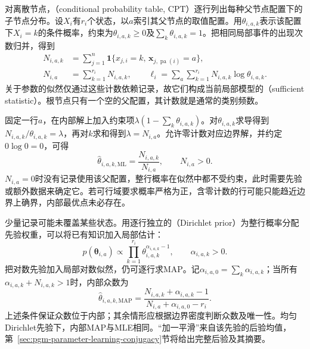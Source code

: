 对离散节点，（conditional probability table, CPT）逐行列出每种父节点配置下的子节点分布。设$X_i$有$r_i$个状态，以$a$索引其父节点的取值配置。用$\theta_{i,a,k}$表示该配置下$X_i=k$的条件概率，约束为$\theta_{i,a,k}\geq0$及$\sum_k\theta_{i,a,k}=1$。把相同局部事件的出现次数归并，得到
\begin{equation}
  \begin{aligned}
    N_{i,a,k}
      &=\sum_{j=1}^n
        \mathbf{1}\{x_{j,i}=k,\,
          \bm{x}_{j,\operatorname{pa}(i)}=a\},\\
    N_{i,a}&=\sum_{k=1}^{r_i}N_{i,a,k},\qquad
    \ell_i=\sum_a\sum_{k=1}^{r_i}
      N_{i,a,k}\log\theta_{i,a,k}.
  \end{aligned}
  \label{eq:pgm-parameter-learning-counts}
\end{equation}
关于参数的似然仅通过这些计数依赖记录，故它们构成当前局部模型的（sufficient statistic）。根节点只有一个空的父配置，其计数就是通常的类别频数。

固定一行$a$，在内部解上加入约束项$\lambda(1-\sum_k\theta_{i,a,k})$。对$\theta_{i,a,k}$求导得到$N_{i,a,k}/\theta_{i,a,k}=\lambda$，再对$k$求和得到$\lambda=N_{i,a}$。允许零计数对应边界解，并约定$0\log0=0$，可得
\begin{equation}
  \widehat{\theta}_{i,a,k,\mathrm{ML}}
    =\frac{N_{i,a,k}}{N_{i,a}},\qquad N_{i,a}>0.
  \label{eq:pgm-parameter-learning-cpt-mle}
\end{equation}
$N_{i,a}=0$时没有记录使用该父配置，整行概率在似然中都不受约束，此时需要先验或额外数据来确定它。若可行域要求概率严格为正，含零计数的行可能只能趋近边界上确界，内部最优点未必存在。

少量记录可能未覆盖某些状态。用逐行独立的（Dirichlet prior）为整行概率分配先验权重，可以将已有知识加入局部估计：
\[
  p(\bm{\theta}_{i,a})
  \propto\prod_{k=1}^{r_i}
    \theta_{i,a,k}^{\alpha_{i,a,k}-1},
  \qquad \alpha_{i,a,k}>0.
\]
把对数先验加入局部对数似然，仍可逐行求MAP。记$\alpha_{i,a,0}=\sum_k\alpha_{i,a,k}$；当所有$\alpha_{i,a,k}+N_{i,a,k}>1$时，内部众数为
\begin{equation}
  \widehat{\theta}_{i,a,k,\mathrm{MAP}}
    =\frac{N_{i,a,k}+\alpha_{i,a,k}-1}
            {N_{i,a}+\alpha_{i,a,0}-r_i}.
  \label{eq:pgm-parameter-learning-cpt-map}
\end{equation}
上述条件保证众数位于内部；其余情形应根据边界密度判断众数及唯一性。均匀Dirichlet先验下，内部MAP与MLE相同。“加一平滑”来自该先验的后验均值，第~\ref{sec:pgm-parameter-learning-conjugacy}节将给出完整后验及其摘要。

